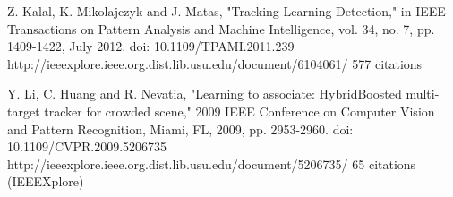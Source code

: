 \documentclass[11pt]{article}
\begin{document}
Z. Kalal, K. Mikolajczyk and J. Matas, "Tracking-Learning-Detection," in IEEE Transactions on Pattern Analysis and Machine Intelligence, vol. 34, no. 7, pp. 1409-1422, July 2012. doi: 10.1109/TPAMI.2011.239
http://ieeexplore.ieee.org.dist.lib.usu.edu/document/6104061/
577 citations

Y. Li, C. Huang and R. Nevatia, "Learning to associate: HybridBoosted multi-target tracker for crowded scene," 2009 IEEE Conference on Computer Vision and Pattern Recognition, Miami, FL, 2009, pp. 2953-2960. doi: 10.1109/CVPR.2009.5206735
http://ieeexplore.ieee.org.dist.lib.usu.edu/document/5206735/
65 citations (IEEEXplore)
\end{document}
